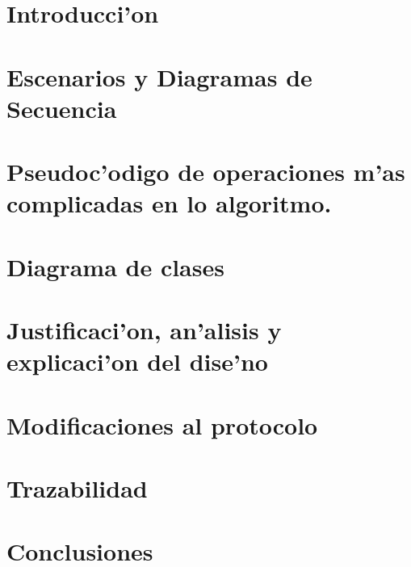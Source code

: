 \documentclass[spanish, a4paper, 10pt, titlepage]{article}
\author{Echevarr'ia - Farjat - Freijo - Giusto}
\begin{document}

\tableofcontents
\clearpage



\section{Introducci'on}

\clearpage
 
\section{Escenarios y Diagramas de Secuencia}

\clearpage

\section{Pseudoc'odigo de operaciones m'as complicadas en lo algoritmo.}



\section{Diagrama de clases}

\clearpage

\section{Justificaci'on, an'alisis y explicaci'on del dise'no}

\clearpage

\section{Modificaciones al protocolo}

\clearpage


\section{Trazabilidad}

\clearpage

\section{Conclusiones}

\clearpage
\end{document}

